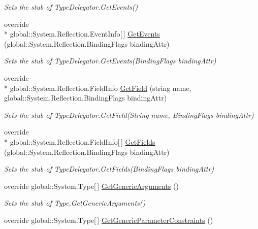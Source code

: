 \begin{DoxyCompactItemize}
\begin{DoxyCompactList}\small\item\em Sets the stub of Type\-Delegator.\-Get\-Events()\end{DoxyCompactList}\item 
override \\*
global\-::\-System.\-Reflection.\-Event\-Info\mbox{[}$\,$\mbox{]} \hyperlink{class_system_1_1_reflection_1_1_fakes_1_1_stub_type_delegator_a670b659e68dd1ba1e43a110806c324b3}{Get\-Events} (global\-::\-System.\-Reflection.\-Binding\-Flags binding\-Attr)
\begin{DoxyCompactList}\small\item\em Sets the stub of Type\-Delegator.\-Get\-Events(\-Binding\-Flags binding\-Attr)\end{DoxyCompactList}\item 
override \\*
global\-::\-System.\-Reflection.\-Field\-Info \hyperlink{class_system_1_1_reflection_1_1_fakes_1_1_stub_type_delegator_a5388e531c0bc11dc1e18cd61802d5705}{Get\-Field} (string name, global\-::\-System.\-Reflection.\-Binding\-Flags binding\-Attr)
\begin{DoxyCompactList}\small\item\em Sets the stub of Type\-Delegator.\-Get\-Field(\-String name, Binding\-Flags binding\-Attr)\end{DoxyCompactList}\item 
override \\*
global\-::\-System.\-Reflection.\-Field\-Info\mbox{[}$\,$\mbox{]} \hyperlink{class_system_1_1_reflection_1_1_fakes_1_1_stub_type_delegator_a287ee80b012505a40043126433e74e12}{Get\-Fields} (global\-::\-System.\-Reflection.\-Binding\-Flags binding\-Attr)
\begin{DoxyCompactList}\small\item\em Sets the stub of Type\-Delegator.\-Get\-Fields(\-Binding\-Flags binding\-Attr)\end{DoxyCompactList}\item 
override global\-::\-System.\-Type\mbox{[}$\,$\mbox{]} \hyperlink{class_system_1_1_reflection_1_1_fakes_1_1_stub_type_delegator_a1654fbaaa7ee7e828c2c4322e1dd6979}{Get\-Generic\-Arguments} ()
\begin{DoxyCompactList}\small\item\em Sets the stub of Type.\-Get\-Generic\-Arguments()\end{DoxyCompactList}\item 
override global\-::\-System.\-Type\mbox{[}$\,$\mbox{]} \hyperlink{class_system_1_1_reflection_1_1_fakes_1_1_stub_type_delegator_adff74c08ef10fd85a39d0fba80a3dbbd}{Get\-Generic\-Parameter\-Constraints} ()

\end{DoxyCompactItemize}
